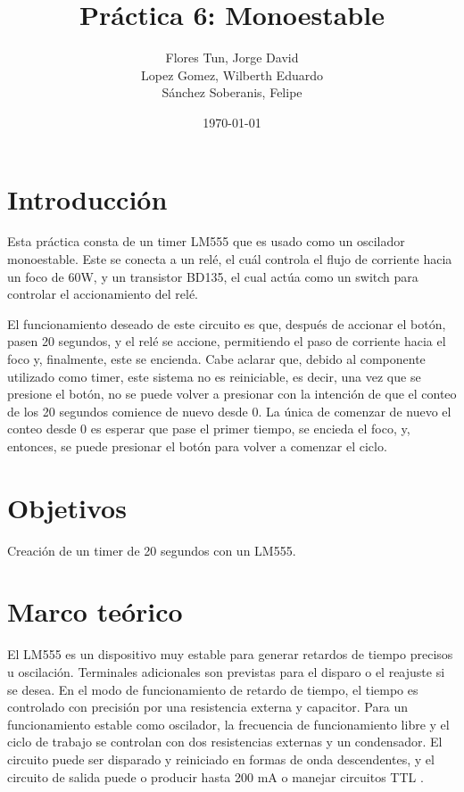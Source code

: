 \documentclass{article}
\title{Práctica 6: Monoestable}
\author{
    Flores Tun, Jorge David \\
    Lopez Gomez, Wilberth Eduardo \\
    Sánchez Soberanis, Felipe
}
\date{\today}
\begin{document}
\maketitle

\tableofcontents

\section{Introducción}

Esta práctica consta de un timer LM555 que es usado como un oscilador monoestable. Este se conecta a un relé, el cuál controla el flujo de corriente hacia un foco de 60W, y un transistor BD135, el cual actúa como un switch para controlar el accionamiento del relé.

El funcionamiento deseado de este circuito es que, después de accionar el botón, pasen 20 segundos, y el relé se accione, permitiendo el paso de corriente hacia el foco y, finalmente, este se encienda. Cabe aclarar que, debido al componente utilizado como timer, este sistema no es reiniciable, es decir, una vez que se presione el botón, no se puede volver a presionar con la intención de que el conteo de los 20 segundos comience de nuevo desde 0. La única de comenzar de nuevo el conteo desde 0 es esperar que pase el primer tiempo, se encieda el foco, y, entonces, se puede presionar el botón para volver a comenzar el ciclo.

\section{Objetivos}

Creación de un timer de 20 segundos con un LM555.

\section{Marco teórico}

El LM555 es un dispositivo muy estable para generar retardos de tiempo precisos u oscilación. Terminales adicionales son previstas para el disparo o el reajuste si se desea. En el modo de funcionamiento de retardo de tiempo, el tiempo es controlado con precisión por una resistencia externa y capacitor. Para un funcionamiento estable como oscilador, la frecuencia de funcionamiento libre y el ciclo de trabajo se controlan con dos resistencias externas y un condensador. El circuito puede ser disparado y reiniciado en formas de onda descendentes, y el circuito de salida puede o producir hasta 200 mA o manejar circuitos TTL \parencite{texas_instruments_lm555_2015}.
\end{document}
